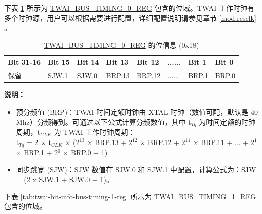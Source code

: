 \documentclass[main\_\_CN.tex]{subfiles}
\begin{document}
下表 \ref{tab:twai-bit-info-bus-timing-0-reg} 所示为 \hyperref[regdesc:TWAIBUSTIMING0REG]{TWAI\_BUS\_TIMING\_0\_REG} 包含的位域。TWAI 工作时钟有多个时钟源，用户可以根据需要进行配置，详细配置说明请参见章节 \ref{mod:resclk} \textit{}。

\begin{longtable}[c]{|p{2cm}|p{1.5cm}|p{1.5cm}|p{1.5cm}|p{1.5cm}|p{1.5cm}|p{1.5cm}|p{1.5cm}|}
\caption{\hyperref[regdesc:TWAIBUSTIMING0REG]{TWAI\_BUS\_TIMING\_0\_REG} 的位信息 (0x18)}
\label{tab:twai-bit-info-bus-timing-0-reg}\\\hline
\rowcolor{lightgray}
  \textbf{Bit 31-16} & \textbf{Bit 15} & \textbf{Bit 14} & \textbf{Bit 13} & \textbf{Bit 12} & \textbf{......} & \textbf{Bit 1} & \textbf{Bit 0}\\\hline 
  保留& SJW.1 & SJW.0 & BRP.13 & BRP.12 & ...... & BRP.1 & BRP.0\\\hline
\end{longtable}
\vspace{-1.5em}
{\bfseries 说明：}\\
\begin{itemize}
    \item 预分频值 (BRP)：TWAI 时间定额时钟由 XTAL 时钟（数值可配，默认是 40 Mhz）分频得到。可通过以下公式计算分频数值，其中 t$_{Tq}$ 为时间定额的时钟周期，t$_{CLK}$ 为 TWAI 工作时钟周期：\\

t$_{Tq}$ = 2 × t$_{CLK}$ × (2$^{13}$ × BRP.13 + 2$^{12}$ × BRP.12 + 2$^{11}$ × BRP.11 + ... + 2$^1$ × BRP.1 + 2$^0$ × BRP.0 + 1)
    \item 同步跳宽 (SJW)：SJW 数值在 SJW.0 和 SJW.1 中配置，计算公式为：SJW = (2 x SJW.1 + SJW.0 + 1)。
\end{itemize}

下表 \ref{tab:twai-bit-info-bus-timing-1-reg} 所示为 \hyperref[regdesc:TWAIBUSTIMING1REG]{TWAI\_BUS\_TIMING\_1\_REG} 包含的位域。
\end{document}
